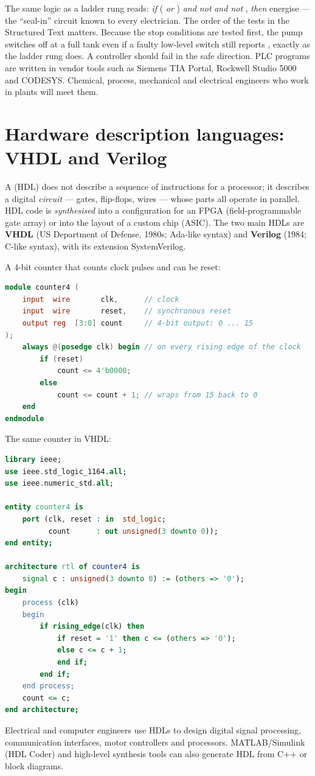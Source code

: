 The same logic as a ladder rung reads: \emph{if} ( \emph{or} )
\emph{and not}  \emph{and not} , \emph{then} energise
 --- the ``seal-in'' circuit known to every electrician. The order of the tests in
the Structured Text matters. Because the stop conditions are tested first, the pump
switches off at a full tank even if a faulty low-level switch still reports ,
exactly as the ladder rung does. A controller should fail in the safe direction. PLC programs are written
in vendor tools such as Siemens TIA Portal, Rockwell Studio 5000 and CODESYS. Chemical,
process, mechanical and electrical engineers who work in plants will meet them.

\section{Hardware description languages: VHDL and Verilog}

A  (HDL) does not describe a sequence of instructions
for a processor; it describes a digital \emph{circuit} --- gates, flip-flops, wires ---
whose parts all operate in parallel. HDL code is \emph{synthesised} into a configuration
for an FPGA (field-programmable gate array) or into the layout of a custom chip (ASIC). The
two main HDLs are \textbf{VHDL} (US Department of Defense, 1980s; Ada-like syntax) and
\textbf{Verilog} (1984; C-like syntax), with its extension SystemVerilog.

A 4-bit counter that counts clock pulses and can be reset:
\begin{lstlisting}[language=Verilog]
module counter4 (
    input  wire       clk,      // clock
    input  wire       reset,    // synchronous reset
    output reg  [3:0] count     // 4-bit output: 0 ... 15
);
    always @(posedge clk) begin // on every rising edge of the clock
        if (reset)
            count <= 4'b0000;
        else
            count <= count + 1; // wraps from 15 back to 0
    end
endmodule
\end{lstlisting}
The same counter in VHDL:
\begin{lstlisting}[language=VHDL]
library ieee;
use ieee.std_logic_1164.all;
use ieee.numeric_std.all;

entity counter4 is
    port (clk, reset : in  std_logic;
          count      : out unsigned(3 downto 0));
end entity;

architecture rtl of counter4 is
    signal c : unsigned(3 downto 0) := (others => '0');
begin
    process (clk)
    begin
        if rising_edge(clk) then
            if reset = '1' then c <= (others => '0');
            else c <= c + 1;
            end if;
        end if;
    end process;
    count <= c;
end architecture;
\end{lstlisting}
Electrical and computer engineers use HDLs to design digital signal processing,
communication interfaces, motor controllers and processors. MATLAB/Simulink (HDL Coder)
and high-level synthesis tools can also generate HDL from C++ or block diagrams.

